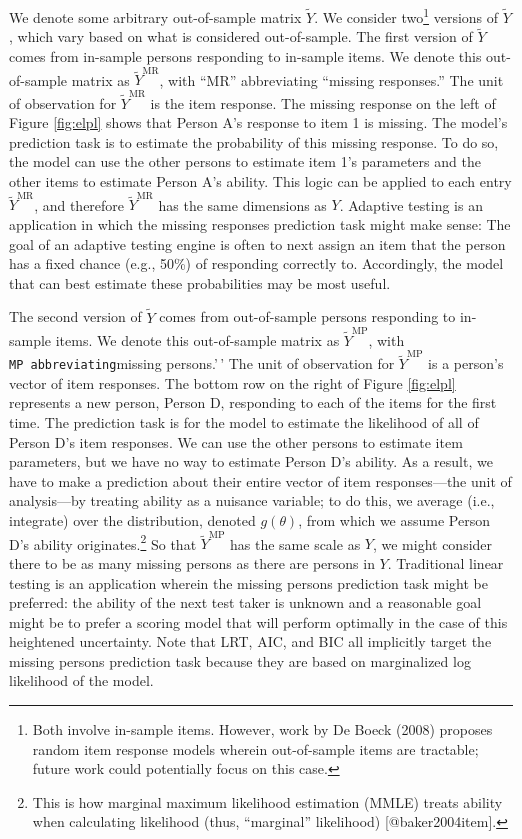\documentclass[
  english,
  man,floatsintext]{apa7}
\begin{document}
We denote some arbitrary out-of-sample matrix \(\tilde Y\). We consider two\footnote{Both involve in-sample items. However, work by De Boeck (2008) proposes random item response models wherein out-of-sample items are tractable; future work could potentially focus on this case.} versions of \(\tilde Y\), which vary based on what is considered out-of-sample. The first version of \(\tilde Y\) comes from in-sample persons responding to in-sample items. We denote this out-of-sample matrix as \(\tilde Y^{\text{MR}}\), with ``MR'' abbreviating ``missing responses.'' The unit of observation for \(\tilde Y^{\text{MR}}\) is the item response. The missing response on the left of Figure \ref{fig:elpl} shows that Person A's response to item 1 is missing. The model's prediction task is to estimate the probability of this missing response. To do so, the model can use the other persons to estimate item 1's parameters and the other items to estimate Person A's ability. This logic can be applied to each entry \(\tilde Y^{\text{MR}}\), and therefore \(\tilde Y^{\text{MR}}\) has the same dimensions as \(Y\). Adaptive testing is an application in which the missing responses prediction task might make sense: The goal of an adaptive testing engine is often to next assign an item that the person has a fixed chance (e.g., 50\%) of responding correctly to. Accordingly, the model that can best estimate these probabilities may be most useful.

The second version of \(\tilde Y\) comes from out-of-sample persons responding to in-sample items. We denote this out-of-sample matrix as \(\tilde Y^{\text{MP}}\), with \texttt{MP\textquotesingle{}\textquotesingle{}\ abbreviating}missing persons.'\,' The unit of observation for \(\tilde Y^{\text{MP}}\) is a person's vector of item responses. The bottom row on the right of Figure \ref{fig:elpl} represents a new person, Person D, responding to each of the items for the first time. The prediction task is for the model to estimate the likelihood of all of Person D's item responses. We can use the other persons to estimate item parameters, but we have no way to estimate Person D's ability. As a result, we have to make a prediction about their entire vector of item responses---the unit of analysis---by treating ability as a nuisance variable; to do this, we average (i.e., integrate) over the distribution, denoted \(g(\theta)\), from which we assume Person D's ability originates.\footnote{This is how marginal maximum likelihood estimation (MMLE) treats ability when calculating likelihood (thus, ``marginal'' likelihood) [@baker2004item].} So that \(\tilde Y^{\text{MP}}\) has the same scale as \(Y\), we might consider there to be as many missing persons as there are persons in \(Y\). Traditional linear testing is an application wherein the missing persons prediction task might be preferred: the ability of the next test taker is unknown and a reasonable goal might be to prefer a scoring model that will perform optimally in the case of this heightened uncertainty. Note that LRT, AIC, and BIC all implicitly target the missing persons prediction task because they are based on marginalized log likelihood of the model.
\end{document}
